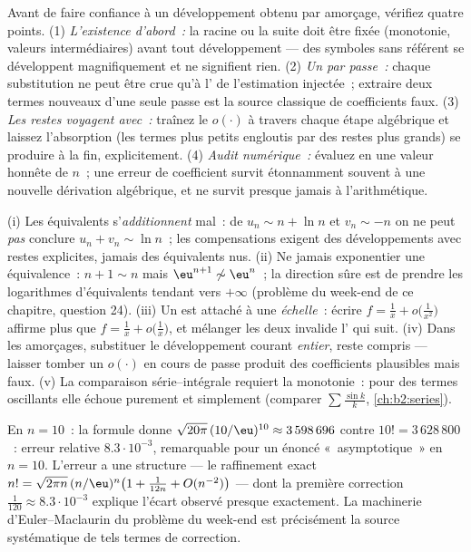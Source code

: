 \begin{method}\label{met:b2:comparison:checklist}
Avant de faire confiance à un développement obtenu par amorçage,
vérifiez quatre points.
(1) \emph{L'existence d'abord~:} la racine ou la suite doit être fixée
(monotonie, valeurs intermédiaires) avant tout développement
--- des symboles sans référent se développent magnifiquement et ne
signifient rien. (2) \emph{Un  par passe~:} chaque substitution
ne peut être crue qu'à l' de l'estimation injectée~; extraire
deux termes nouveaux d'une seule passe est la source classique de
coefficients faux. (3) \emph{Les restes voyagent avec~:} traînez le
$o(\cdot)$ à travers chaque étape algébrique et laissez l'absorption
(les termes plus petits engloutis par des restes plus grands) se
produire à la fin, explicitement. (4) \emph{Audit numérique~:} évaluez
en une valeur honnête de $n$~; une erreur de coefficient survit
étonnamment souvent à une nouvelle dérivation algébrique, et ne survit
presque jamais à l'arithmétique.
\end{method}

\begin{remark}\label{rem:b2:comparison:pitfalls}
(i) Les équivalents s'\emph{additionnent} mal~: de $u_n \sim n + \ln n$
et $v_n \sim -n$ on ne peut \emph{pas} conclure $u_n + v_n \sim \ln
n$~; les compensations exigent des développements avec restes
explicites, jamais des équivalents nus. (ii) Ne jamais exponentier une
équivalence~: $n + 1 \sim n$ mais $\eu^{n+1} \not\sim \eu^n$~; la
direction sûre est de prendre les logarithmes d'équivalents tendant
vers $+\infty$ (problème du week-end de ce chapitre, question 24).
(iii) Un  est attaché à une \emph{échelle}~:
écrire $f = \frac1x + o\bigl(\frac1{x^2}\bigr)$ affirme plus que $f =
\frac1x + o\bigl(\frac1x\bigr)$, et mélanger les deux invalide
l' qui suit. (iv) Dans les amorçages, substituer le
développement courant \emph{entier}, reste compris --- laisser tomber
un $o(\cdot)$ en cours de passe produit des coefficients plausibles
mais faux. (v) La comparaison série--intégrale requiert la monotonie~:
pour des termes oscillants elle échoue purement et simplement (comparer
$\sum\frac{\sin k}k$, \cref{ch:b2:series}).
\end{remark}

\begin{example}\label{ex:b2:comparison:stirlingnum}
En $n = 10$~: la formule donne $\sqrt{20\pi}\,(10/\eu)^{10}
\approx 3\,598\,696$ contre $10! = 3\,628\,800$~: erreur relative
$8.3\cdot10^{-3}$, remarquable pour un énoncé «~asymptotique~» en
$n = 10$. L'erreur a une structure --- le raffinement exact $n!
= \sqrt{2\pi n}\,(n/\eu)^n\bigl(1 + \frac1{12n} +
O(n^{-2})\bigr)$ --- dont la première correction $\frac1{120} \approx
8.3\cdot10^{-3}$ explique l'écart observé presque exactement. La
machinerie d'Euler--Maclaurin du problème du week-end est précisément
la source systématique de tels termes de correction.
\end{example}

